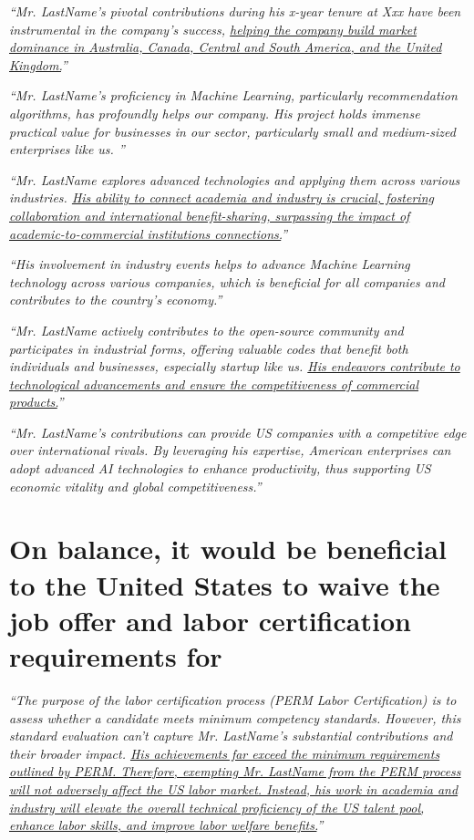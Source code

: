\documentclass[11pt]{article}
\let\oldenquote\enquote
\renewcommand{\enquote}[1]{{\itshape\oldenquote{#1}}}
\begin{document}
\enquote{Mr. LastName's pivotal contributions during his x-year tenure at Xxx have been instrumental in the company's success, \ul{helping the company build market dominance in Australia, Canada, Central and South America, and the United Kingdom.}} 

\enquote{Mr. LastName's proficiency in Machine Learning, particularly recommendation algorithms, has profoundly helps our company. His project holds immense practical value for businesses in our sector, particularly small and medium-sized enterprises like us. } 


\enquote{Mr. LastName explores advanced technologies and applying them across various industries. \ul{His ability to connect academia and industry is crucial, fostering collaboration and international benefit-sharing, surpassing the impact of academic-to-commercial institutions connections.}} 


\enquote{His involvement in industry events helps to advance Machine Learning technology across various companies, which is beneficial for all companies and contributes to the country's economy.} 


\enquote{Mr. LastName actively contributes to the open-source community and participates in industrial forms, offering valuable codes that benefit both individuals and businesses, especially startup like us. \ul{His endeavors contribute to technological advancements and ensure the competitiveness of commercial products.}} 


\enquote{Mr. LastName's contributions can provide US companies with a competitive edge over international rivals. By leveraging his expertise, American enterprises can adopt advanced AI technologies to enhance productivity, thus supporting US economic vitality and global competitiveness.} 



\pagebreak

\section{On balance, it would be beneficial to the United States to waive the job offer and labor certification requirements for \dr }


\enquote{The purpose of the labor certification process (PERM Labor Certification) is to assess whether a candidate meets minimum competency standards. However, this standard evaluation can’t capture Mr. LastName's substantial contributions and their broader impact. \ul{His achievements far exceed the minimum requirements outlined by PERM. Therefore, exempting Mr. LastName from the PERM process will not adversely affect the US labor market. Instead, his work in academia and industry will elevate the overall technical proficiency of the US talent pool, enhance labor skills, and improve labor welfare benefits.}} 
\end{document}

